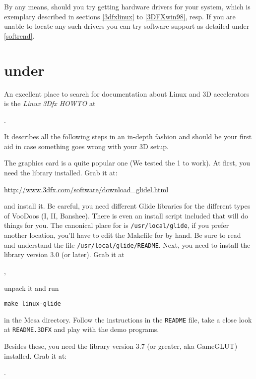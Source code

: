 By any means, should you try getting hardware  drivers for your system,
which is exemplary described in sections \ref{3dfxlinux} to \ref{3DFXwin98}, resp. If you
are unable to locate any such drivers you can try software support as detailed under \ref{softrend}.

\section{ under \label{3dfxlinux}}

An excellent place to search for documentation about Linux and 3D
accelerators is the {\it Linux 3Dfx HOWTO} at

.

It describes all the following steps in an in-depth fashion and
should be your first aid in case something goes wrong with your 3D
setup.

The  graphics card is a quite popular one (We tested
the 1 to work). At first, you need the 
library installed. Grab it at:

\href{http://www.3dfx.com/software/download_glidel.html}{http://www.3dfx.com/software/download\_glidel.html}

 \noindent
and install it.
Be careful, you need different Glide libraries for the different types of VooDoos (I, II, Banshee).
There is even an install script included that will do things for you. The canonical place
for  is \texttt{/usr/local/glide}, if you prefer another location, you'll
have to edit the Makefile for \FlightGear by hand. Be sure to read and understand the
file \texttt{/usr/local/glide/README}. Next, you need to install the  library
version 3.0 (or later). Grab it at

 ,

 \noindent
unpack it and run

  \texttt{make linux-glide}

 \noindent
in the Mesa directory. Follow the instructions in the \texttt{README}
file, take a close look at \texttt{README.3DFX} and play with the demo
programs.

Besides these, you need the  library version 3.7 (or
greater, aka GameGLUT) installed. Grab it at:

   .

